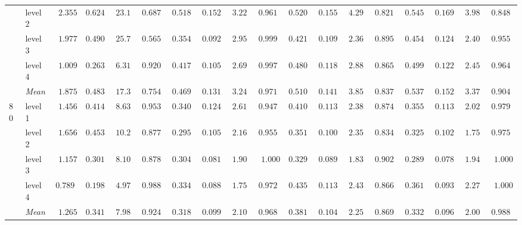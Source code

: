 \begin{table}[htbp]
\begin{tabular}{llrrrrrrrrrrrrrrrr}
 & level 2 & $2.355$ & $0.6243$ & $23.10$ & $0.6875$ & {\boldmath$0.5185$} & {\boldmath$0.1520$} & {\boldmath$3.228$} & {\boldmath$0.9619$} & $0.5207$ & $0.1553$ & $4.299$ & $0.8213$ & $0.5457$ & $0.1697$ & $3.986$ & $0.8486$ \\
 & level 3 & $1.977$ & $0.4900$ & $25.71$ & $0.5654$ & {\boldmath$0.3548$} & {\boldmath$0.0920$} & $2.954$ & $0.9990$ & $0.4212$ & $0.1098$ & {\boldmath$2.364$} & $0.8955$ & $0.4548$ & $0.1246$ & $2.402$ & {\boldmath$0.9551$} \\
 & level 4 & $1.009$ & $0.2630$ & $6.315$ & $0.9209$ & {\boldmath$0.4175$} & {\boldmath$0.1051$} & $2.698$ & $0.9971$ & $0.4802$ & $0.1189$ & $2.882$ & $0.8652$ & $0.4990$ & $0.1227$ & {\boldmath$2.457$} & {\boldmath$0.9648$} \\
 & \textit{Mean} & $1.875$ & $0.4837$ & $17.33$ & $0.7542$ & \colorbox{green!20}{\boldmath$0.4697$} & \colorbox{green!20}{\boldmath$0.1310$} & \colorbox{green!20}{\boldmath$3.241$} & \colorbox{green!20}{\boldmath$0.9719$} & $0.5107$ & $0.1410$ & $3.857$ & $0.8379$ & $0.5373$ & $0.1523$ & $3.379$ & $0.9048$ \\
\midrule
\multirow{5}{*}{80} & level 1 & $1.456$ & $0.4145$ & $8.637$ & $0.9531$ & {\boldmath$0.3405$} & $0.1243$ & $2.613$ & {\boldmath$0.9473$} & $0.4100$ & $0.1139$ & $2.381$ & $0.8740$ & $0.3555$ & {\boldmath$0.1131$} & {\boldmath$2.024$} & $0.9795$ \\
 & level 2 & $1.656$ & $0.4538$ & $10.23$ & $0.8770$ & {\boldmath$0.2954$} & $0.1054$ & $2.161$ & {\boldmath$0.9551$} & $0.3519$ & {\boldmath$0.1006$} & $2.357$ & $0.8340$ & $0.3254$ & $0.1023$ & {\boldmath$1.758$} & $0.9756$ \\
 & level 3 & $1.157$ & $0.3010$ & $8.100$ & $0.8789$ & $0.3043$ & $0.0813$ & $1.903$ & $1.000$ & $0.3291$ & $0.0890$ & {\boldmath$1.835$} & {\boldmath$0.9023$} & {\boldmath$0.2892$} & {\boldmath$0.0786$} & $1.947$ & $1.000$ \\
 & level 4 & $0.7897$ & $0.1980$ & $4.970$ & $0.9883$ & {\boldmath$0.3341$} & {\boldmath$0.0882$} & {\boldmath$1.750$} & {\boldmath$0.9727$} & $0.4351$ & $0.1130$ & $2.430$ & $0.8662$ & $0.3615$ & $0.0937$ & $2.275$ & $1.000$ \\
 & \textit{Mean} & $1.265$ & $0.3418$ & $7.985$ & $0.9243$ & \colorbox{green!20}{\boldmath$0.3186$} & $0.0998$ & $2.107$ & \colorbox{green!20}{\boldmath$0.9688$} & $0.3815$ & $0.1041$ & $2.251$ & $0.8691$ & $0.3329$ & \colorbox{green!20}{\boldmath$0.0969$} & \colorbox{green!20}{\boldmath$2.001$} & $0.9888$ \\
\bottomrule
\end{tabular}
\end{table}
